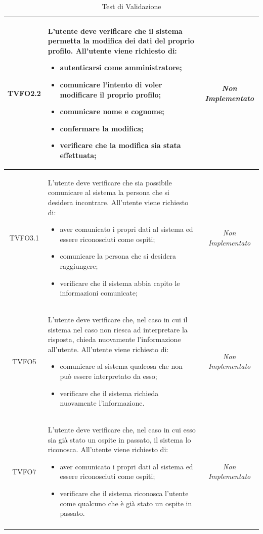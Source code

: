 \begin{longtable}{|c|>{}m{8cm}|c|}
\hypertarget{TVFO2.2}{TVFO2.2} & L'utente deve verificare che il sistema permetta la modifica dei dati del proprio profilo. All'utente viene richiesto di:
\begin{itemize}
\item autenticarsi come amministratore;
\item comunicare l'intento di voler modificare il proprio profilo;
\item comunicare nome e cognome;
\item confermare la modifica;
\item verificare che la modifica sia stata effettuata;
\end{itemize}
 & \textit{Non Implementato}\\ \hline
\hypertarget{TVFO3.1}{TVFO3.1} & L'utente deve verificare che sia possibile comunicare al sistema la persona che si desidera incontrare. All'utente viene richiesto di:
\begin{itemize}
\item aver comunicato i propri dati al sistema ed essere riconosciuti come ospiti;
\item comunicare la persona che si desidera raggiungere;
\item verificare che il sistema abbia capito le informazioni comunicate;
\end{itemize} & \textit{Non Implementato}\\ \hline
\hypertarget{TVFO5}{TVFO5} & L'utente deve verificare che, nel caso in cui il sistema nel caso non riesca ad interpretare la risposta, chieda nuovamente l'informazione all'utente. All'utente viene richiesto di:
\begin{itemize}
\item comunicare al sistema qualcosa che non può essere interpretato da esso;
\item verificare che il sistema richieda nuovamente l'informazione.
\end{itemize} & \textit{Non Implementato}\\ \hline
\hypertarget{TVFO7}{TVFO7} & L'utente deve verificare che, nel caso in cui esso sia già stato un ospite in passato, il sistema lo riconosca. All'utente viene richiesto di:
\begin{itemize}
\item aver comunicato i propri dati al sistema ed essere riconosciuti come ospiti;
\item verificare che il sistema riconosca l'utente come qualcuno che è già stato un ospite in passato.
\end{itemize}
 & \textit{Non Implementato}\\ \hline
\caption[Test di Validazione]{Test di Validazione}
\label{tabella:test0}
\end{longtable}
\clearpage


